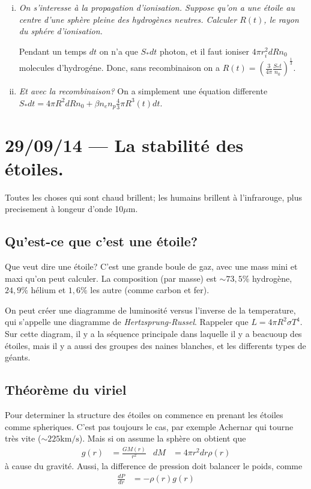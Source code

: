 \documentclass[10pt]{report}
\newcommand{\rd}[2]{\frac{d#1}{d#2}}
\begin{document}
\begin{enumerate}[i)]
    \item \emph{On s'interesse \`a la propagation d'ionisation. Suppose qu'on a une \'etoile au centre d'une sph\`ere pleine des hydrog\`enes neutres. Calculer $R(t)$, le rayon du sph\'ere d'ionisation.}

        Pendant un temps $dt$ on n'a que $S_* dt$ photon, et il faut ioniser $4\pi r_i^2 dR n_0$ molecules d'hydrog\'ene. Donc, sans recombinaison on a $R(t) = \left(\frac{3}{4\pi} \frac{S_*t}{n_0}\right)^{\frac{1}{3}}$. 

    \item \emph{Et avec la recombinaison?} On a simplement une \'equation differente $S_* dt = 4\pi R^2 dR n_0 + \beta n_en_p \frac{4}{3}\pi R^3(t) dt$.
\end{enumerate}
\chapter{29/09/14 --- La stabilit\'e des \'etoiles.}

Toutes les choses qui sont chaud brillent; les humains brillent \`a l'infrarouge, plus precisement \`a longeur d'onde 10$\mu$m. 

\section{Qu'est-ce que c'est une \'etoile?}

Que veut dire une \'etoile? C'est une grande boule de gaz, avec une mass mini et maxi qu'on peut calculer. La composition (par masse) est $\sim 73,5\%$ hydrog\`ene, $24,9\%$ h\'elium et $1,6\%$ les autre (comme carbon et fer).

On peut cr\'eer une diagramme de luminosit\'e versus l'inverse de la temperature, qui s'appelle une diagramme de \emph{Hertzsprung-Russel}. Rappeler que $L = 4\pi R^2 \sigma T^4$. Sur cette diagram, il y a la s\'equence principale dans laquelle il y a beacuoup des \'etoiles, mais il y a aussi des groupes des naines blanches, et les differents types de g\'eants.

\section{Th\'eor\`eme du viriel}

Pour determiner la structure des \'etoiles on commence en prenant les \'etoiles comme spheriques. C'est pas toujours le cas, par exemple Achernar qui tourne tr\`es vite ($\sim 225\mathrm{ km/s}$). Mais si on assume la sph\`ere on obtient que
\begin{align}
    g(r) &= \frac{GM(r)}{r^2} & dM &= 4\pi r^2 dr \rho(r)
\end{align}
\`a cause du gravit\'e. Aussi, la difference de pression doit balancer le poids, comme
\begin{align}
    \rd{P}{r} &= -\rho(r) g(r)
\end{align}
\end{document}
